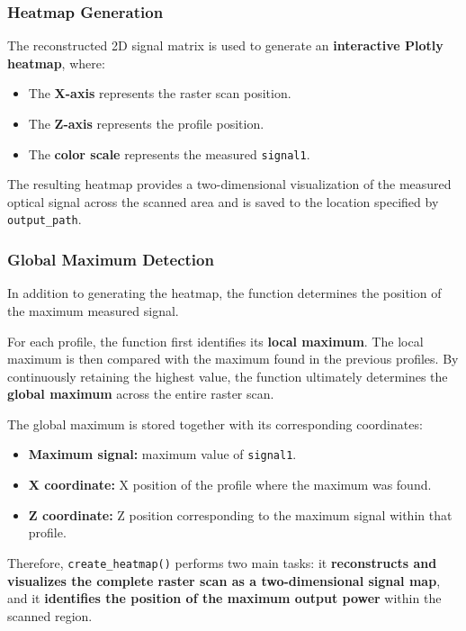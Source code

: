 \documentclass[../../main.tex]{subfiles}
\begin{document}
\subsubsection{Heatmap Generation}

The reconstructed 2D signal matrix is used to generate an
\textbf{interactive Plotly heatmap}, where:

\begin{itemize}
    \item The \textbf{X-axis} represents the raster scan position.
    \item The \textbf{Z-axis} represents the profile position.
    \item The \textbf{color scale} represents the measured
    \texttt{signal1}.
\end{itemize}

The resulting heatmap provides a two-dimensional visualization of the
measured optical signal across the scanned area and is saved to the location
specified by \texttt{output\_path}.


\subsubsection{Global Maximum Detection}

In addition to generating the heatmap, the function determines the position
of the maximum measured signal.

For each profile, the function first identifies its \textbf{local maximum}.
The local maximum is then compared with the maximum found in the previous
profiles. By continuously retaining the highest value, the function
ultimately determines the \textbf{global maximum} across the entire raster
scan.

The global maximum is stored together with its corresponding coordinates:

\begin{itemize}
    \item \textbf{Maximum signal:} maximum value of \texttt{signal1}.
    \item \textbf{X coordinate:} X position of the profile where the maximum
    was found.
    \item \textbf{Z coordinate:} Z position corresponding to the maximum
    signal within that profile.
\end{itemize}

Therefore, \texttt{create\_heatmap()} performs two main tasks: it
\textbf{reconstructs and visualizes the complete raster scan as a
two-dimensional signal map}, and it \textbf{identifies the position of the
maximum output power} within the scanned region.

\newpage


\end{document}
